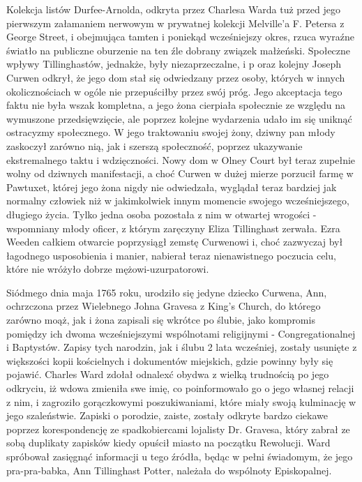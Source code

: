 Kolekcja listów Durfee-Arnolda, odkryta przez Charlesa Warda tuż przed jego pierwszym załamaniem nerwowym w prywatnej kolekcji Melville'a F. Petersa z George Street, i obejmująca tamten i poniekąd wcześniejszy okres, rzuca wyraźne światło na publiczne oburzenie na ten źle dobrany związek małżeński. Społeczne wpływy Tillinghastów, jednakże, były niezaprzeczalne, i p oraz kolejny Joseph Curwen odkrył, że jego dom stał się odwiedzany przez osoby, których w innych okolicznościach w ogóle nie przepuściłby przez swój próg.  Jego akceptacja tego faktu nie była wszak kompletna, a jego żona cierpiała społecznie ze względu na wymuszone przedsięwzięcie, ale poprzez kolejne wydarzenia udało im się uniknąć ostracyzmy społecznego. W jego traktowaniu swojej żony, dziwny pan młody zaskoczył zarówno nią, jak i szerszą społeczność, poprzez ukazywanie ekstremalnego taktu i wdzięczności. Nowy dom w Olney Court był teraz zupełnie wolny od dziwnych manifestacji, a choć Curwen w dużej mierze porzucił farmę w Pawtuxet, której jego żona nigdy nie odwiedzała, wyglądał teraz bardziej jak normalny człowiek niż w jakimkolwiek innym momencie swojego wcześniejszego, długiego życia. Tylko jedna osoba pozostała z nim w otwartej wrogości - wspomniany młody oficer, z którym zaręczyny Eliza Tillinghast zerwała. Ezra Weeden całkiem otwarcie poprzysiągł zemstę Curwenowi i, choć zazwyczaj był łagodnego usposobienia i manier, nabierał teraz nienawistnego poczucia celu, które nie wróżyło dobrze mężowi-uzurpatorowi.

Siódmego dnia maja 1765 roku, urodziło się jedyne dziecko Curwena, Ann, ochrzczona przez Wielebnego Johna Gravesa z King's Church, do którego zarówno moąż, jak i żona zapisali się wkrótce po ślubie, jako kompromis pomiędzy ich dwoma wcześniejszymi wspólnotami religijnymi - Congregationalnej i Baptystów. Zapisy tych narodzin, jak i ślubu 2 lata wcześniej, zostały usunięte z większości kopii kościelnych i dokumentów miejskich, gdzie powinny były się pojawić. Charles Ward zdołał odnalexć obydwa z wielką trudnością po jego odkryciu, iż wdowa zmieniła swe imię, co poinformowało go o jego własnej relacji z nim, i zagroziło gorączkowymi poszukiwaniami, które miały swoją kulminację w jego szaleństwie. Zapiski o porodzie, zaiste, zostały odkryte bardzo ciekawe poprzez korespondencję ze spadkobiercami lojalisty Dr. Gravesa, który zabrał ze sobą duplikaty zapisków kiedy opuścił miasto na początku Rewolucji. Ward spróbował zasięgnąć informacji u tego źródła, będąc w pełni świadomym, że jego pra-pra-babka, Ann Tillinghast Potter, należała do wspólnoty Episkopalnej.

